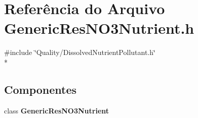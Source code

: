 \section{Referência do Arquivo Generic\+Res\+N\+O3\+Nutrient.\+h}
\label{_generic_res_n_o3_nutrient_8h}
{\ttfamily \#include \char`\"{}Quality/\+Dissolved\+Nutrient\+Pollutant.\+h\char`\"{}}\\*
\subsection*{Componentes}
\begin{DoxyCompactItemize}
\item 
class {\bf Generic\+Res\+N\+O3\+Nutrient}
\end{DoxyCompactItemize}
